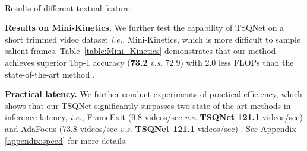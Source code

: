 \documentclass[runningheads]{llncs}
\newcommand{\tabref}[1]{Table~\ref{#1}}
\begin{document}
\begin{table*}[t]
\begin{minipage}[t]{0.45\linewidth}
\end{minipage} 
\\ \vskip 2mm
\begin{minipage}[t]{0.45\linewidth}
\caption{Results of different textual feature.}
\label{table:textual}
\centering
\setlength{\tabcolsep}{6.0pt}
\renewcommand{\arraystretch}{1.15}
\end{minipage}
\hfill
\begin{minipage}[t]{0.45\linewidth}
\centering
\caption{Impacts of initialization of TSQ embedding.}
\label{table:init}
\setlength{\tabcolsep}{3.0pt}
\renewcommand{\arraystretch}{1.15}
\end{minipage}

\end{table*}





 
\noindent\textbf{Results on Mini-Kinetics.}
We further test the capability of TSQNet on a short trimmed video dataset \emph{i.e.,} Mini-Kinetics, which is more difficult to sample salient frames.
\tabref{table:Mini_Kinetics} demonstrates that our method achieves superior Top-1 accuracy (\textbf{73.2} \emph{v.s.} 72.9) with 2.0 less FLOPs than the state-of-the-art method \cite{adafocus}.

\noindent\textbf{Practical latency.}
We further conduct experiments of practical efficiency, which shows that our TSQNet significantly surpasses two state-of-the-art methods in inference latency, \emph{i.e.,} FrameExit \cite{frameexit} (9.8 videos/sec \emph{v.s.} \textbf{TSQNet 121.1} videos/sec) and AdaFocus \cite{adafocus} (73.8 videos/sec \emph{v.s.} \textbf{TSQNet 121.1} videos/sec) \footnotemark[1]. See Appendix \ref{appendix:speed} for more details.
\end{document}
